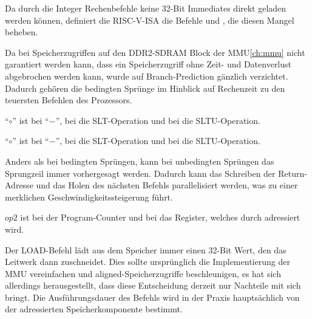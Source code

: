 
Da durch die Integer Rechenbefehle keine 32-Bit Immediates direkt geladen werden
k\"onnen, definiert die RISC-V-ISA die Befehle  und , die
diesen Mangel beheben.



Da bei Speicherzugriffen auf den DDR2-SDRAM Block der MMU\ref{ch:mmu} nicht
garantiert werden kann, dass ein Speicherzugriff ohne Zeit- und Datenverlust
abgebrochen werden kann, wurde auf Branch-Prediction g\"anzlich verzichtet.
Dadurch geh\"ören die bedingten Spr\"unge im Hinblick auf Rechenzeit zu den
teuersten Befehlen des Prozessors.

{``\(\circ\)'' ist bei  ``\(-\)'', bei  die SLT-Operation
und bei  die SLTU-Operation.
}

{``\(\circ\)'' ist bei  ``\(-\)'', bei  die SLT-Operation
und bei  die SLTU-Operation.
}

Anders als bei bedingten Spr\"ungen, kann bei unbedingten Spr\"ungen das
Sprungzeil immer vorhergesagt werden. Dadurch kann das Schreiben der
Return-Adresse und das Holen des n\"achsten Befehls parallelisiert werden, was
zu einer merklichen Geschwindigkeitssteigerung f\"uhrt.

{\(op2\) ist bei  der Program-Counter und bei  das
Register, welches durch  adressiert wird.
}

Der LOAD-Befehl l\"adt aus dem Speicher immer einen 32-Bit Wert, den das
Leitwerk dann zuschneidet. Dies sollte urspr\"unglich die Implementierung der
MMU vereinfachen und aligned-Speicherzugriffe beschleunigen, es hat sich
allerdings herausgestellt, dass diese Entscheidung derzeit nur Nachteile mit
sich bringt. Die Ausf\"uhrungsdauer des Befehls wird in der Praxis
haupts\"achlich von der adressierten Speicherkomponente bestimmt.

